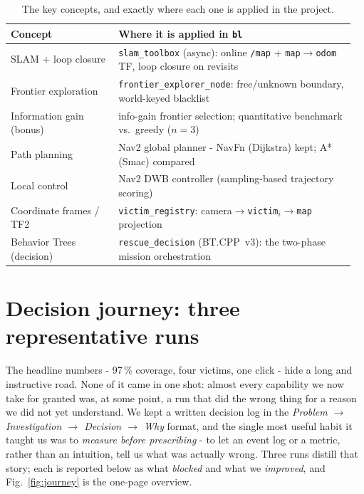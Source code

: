 \documentclass[11pt,a4paper]{article}
\begin{document}
\begin{table}[htbp]\centering\footnotesize
\begin{tabular}{@{}p{0.30\linewidth}p{0.66\linewidth}@{}}
\toprule
\textbf{Concept} & \textbf{Where it is applied in \texttt{bl}}\\
\midrule
SLAM + loop closure & \texttt{slam\_toolbox} (async): online \texttt{/map} + \texttt{map}$\to$\texttt{odom} TF, loop closure on revisits\\
Frontier exploration & \texttt{frontier\_explorer\_node}: free/unknown boundary, world-keyed blacklist\\
Information gain (bonus) & info-gain frontier selection; quantitative benchmark vs.\ greedy ($n{=}3$)\\
Path planning & Nav2 global planner - NavFn (Dijkstra) kept; A* (Smac) compared\\
Local control & Nav2 DWB controller (sampling-based trajectory scoring)\\
Coordinate frames / TF2 & \texttt{victim\_registry}: camera$\to$\texttt{victim}$_i\to$\texttt{map} projection\\
Behavior Trees (decision) & \texttt{rescue\_decision} (BT.CPP~v3): the two-phase mission orchestration\\
\bottomrule
\end{tabular}
\caption{The key concepts, and exactly where each one is applied in the project.}
\label{tab:concepts}
\end{table}

\section{Decision journey: three representative runs}
The headline numbers - 97\,\% coverage, four victims, one click - hide a long and instructive road.
None of it came in one shot: almost every capability we now take for granted was, at some point, a run
that did the wrong thing for a reason we did not yet understand. We kept a written decision log in the
\emph{Problem $\to$ Investigation $\to$ Decision $\to$ Why} format, and the single most useful habit it
taught us was to \emph{measure before prescribing} - to let an event log or a metric, rather than an
intuition, tell us what was actually wrong. Three runs distill that story; each is reported below as
what \emph{blocked} and what we \emph{improved}, and Fig.~\ref{fig:journey} is the one-page overview.
\end{document}
